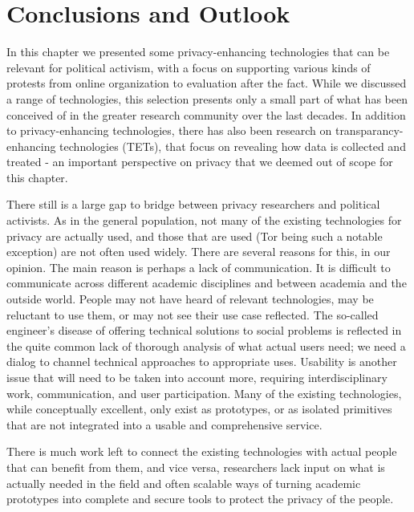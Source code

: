 \section{Conclusions and Outlook}
\label{Conclusions}
In this chapter we presented some privacy-enhancing technologies that can be 
relevant for political activism, with a focus on supporting various kinds of 
protests from online organization to evaluation after the fact. While we 
discussed a range of technologies, this selection presents only a small part of 
what has been conceived of in the greater research community over the last
decades. In addition to privacy-enhancing technologies, there has also
been research on transparancy-enhancing technologies (TETs), that
focus on revealing how data is collected and treated - an important
perspective on privacy that we deemed out of scope for this chapter.

There 
still is a large gap to bridge between privacy researchers and political 
activists. As in the general population, not many of the existing technologies 
for privacy are actually used, and those that are used (Tor being such 
a notable exception) are not often used widely. There are several reasons for 
this, in our opinion. The main reason is perhaps a lack of communication. It is 
difficult to communicate across different academic disciplines and between 
academia and the outside world. People may not have heard of relevant 
technologies, may be reluctant to use them, or may not see their use case 
reflected. The so-called engineer's disease of offering technical solutions to 
social problems is reflected in the quite common lack of thorough analysis of 
what actual users need; we need a dialog to channel technical
approaches to appropriate uses. Usability is another issue that will need to be taken 
into account more, requiring interdisciplinary work, communication, and user 
participation. Many of the existing technologies, while conceptually excellent, 
only exist as prototypes, or as isolated primitives that are not integrated 
into a usable and comprehensive service. 

There is much work left to connect the 
existing technologies with actual people that can benefit from them, and vice 
versa, researchers lack input on what is actually needed in the field and often 
scalable ways of turning academic prototypes into complete and secure tools to 
protect the privacy of the people.
